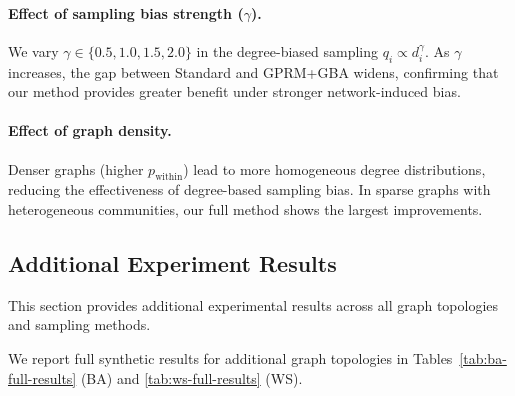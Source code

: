 \documentclass{article}
\theoremstyle{plain}
\theoremstyle{definition}
\theoremstyle{remark}
\begin{document}
\paragraph{Effect of sampling bias strength ($\gamma$).}
We vary $\gamma \in \{0.5, 1.0, 1.5, 2.0\}$ in the degree-biased sampling
$q_i \propto d_i^\gamma$. As $\gamma$ increases, the gap between Standard and
GPRM+GBA widens, confirming that our method provides greater benefit under
stronger network-induced bias.

\paragraph{Effect of graph density.}
Denser graphs (higher $p_{\text{within}}$) lead to more homogeneous degree
distributions, reducing the effectiveness of degree-based sampling bias. In
sparse graphs with heterogeneous communities, our full method shows the largest
improvements.

\subsection{Additional Experiment Results}
\label{app:full-synthetic}

This section provides additional experimental results across all graph topologies and sampling methods.

We report full synthetic results for additional graph topologies in
Tables~\ref{tab:ba-full-results} (BA) and \ref{tab:ws-full-results} (WS).
\end{document}
